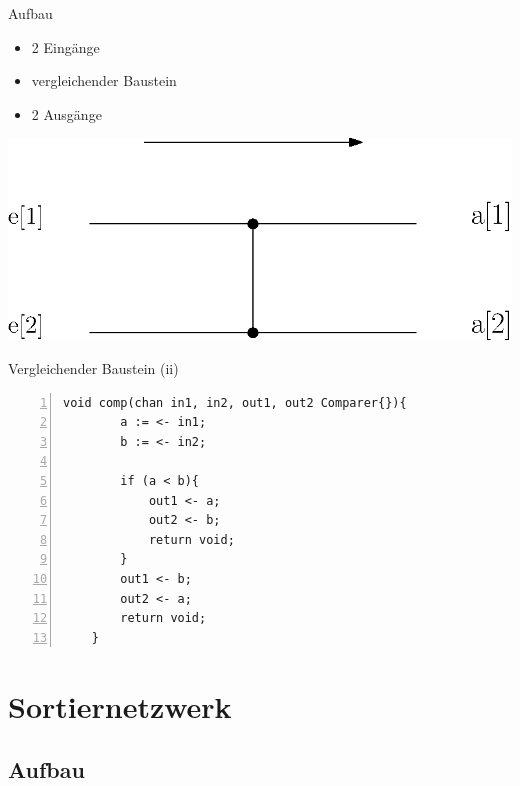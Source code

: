 \documentclass[ucs,9pt]{beamer}
\begin{document}
\begin{frame}{Aufbau}
    \begin{minipage}[c]{14.5cm}
    		\begin{minipage}[c]{5cm}
        		\begin{itemize}
            		\item 2 Eingänge
	            	\item vergleichender Baustein
    		        	\item 2 Ausgänge
        		\end{itemize}
	    \end{minipage}
		\begin{minipage}[c]{5cm}
			\includegraphics[scale=0.5]{Komparator1.eps}
	 	\end{minipage}
    \end{minipage}
\end{frame}

\begin{frame}[fragile]{Vergleichender Baustein (ii)}
\begin{center}
\begin{lstlisting}[laguage={inform},tabsize=4,numbers=left]
    void comp(chan in1, in2, out1, out2 Comparer{}){
        a := <- in1;
        b := <- in2;
        
        if (a < b){
            out1 <- a;
            out2 <- b;
            return void;
        }
        out1 <- b;
        out2 <- a;
        return void;
    }
\end{lstlisting}
\end{center}
\end{frame}

\section{Sortiernetzwerk}
\subsection{Aufbau}
\end{document}
